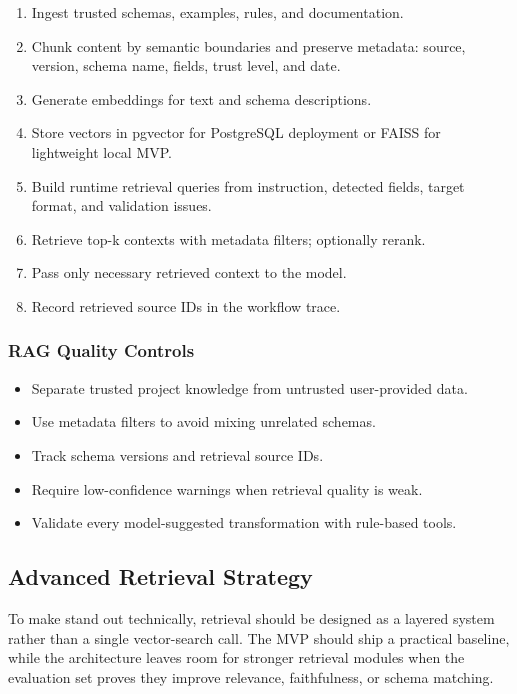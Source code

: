 \begin{enumerate}
  \item Ingest trusted schemas, examples, rules, and documentation.
  \item Chunk content by semantic boundaries and preserve metadata: source, version, schema name, fields, trust level, and date.
  \item Generate embeddings for text and schema descriptions.
  \item Store vectors in pgvector for PostgreSQL deployment or FAISS for lightweight local MVP.
  \item Build runtime retrieval queries from instruction, detected fields, target format, and validation issues.
  \item Retrieve top-k contexts with metadata filters; optionally rerank.
  \item Pass only necessary retrieved context to the model.
  \item Record retrieved source IDs in the workflow trace.
\end{enumerate}

\subsubsection{RAG Quality Controls}

\begin{itemize}
  \item Separate trusted project knowledge from untrusted user-provided data.
  \item Use metadata filters to avoid mixing unrelated schemas.
  \item Track schema versions and retrieval source IDs.
  \item Require low-confidence warnings when retrieval quality is weak.
  \item Validate every model-suggested transformation with rule-based tools.
\end{itemize}

\subsection{Advanced Retrieval Strategy}

To make \projectname{} stand out technically, retrieval should be designed as a layered system rather than a single vector-search call. The MVP should ship a practical baseline, while the architecture leaves room for stronger retrieval modules when the evaluation set proves they improve relevance, faithfulness, or schema matching.


